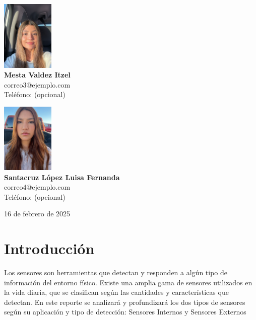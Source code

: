 \documentclass{article}
\begin{document}
\begin{titlepage}
\begin{center}
			\vspace{0.5cm}
			
			\begin{minipage}{0.45\textwidth}
				\begin{center}
					\includegraphics[width=2.5cm]{itzel.jpg} \\
					\textbf{Mesta Valdez Itzel} \\
					correo3@ejemplo.com \\
					Teléfono: (opcional)
				\end{center}
			\end{minipage}
			\hfill
			\begin{minipage}{0.45\textwidth}
				\begin{center}
					\includegraphics[width=2.5cm]{luisa.jpg} \\
					\textbf{Santacruz López Luisa Fernanda} \\
					correo4@ejemplo.com \\
					Teléfono: (opcional)
				\end{center}
			\end{minipage}
			
			\vfill
			16 de febrero de 2025
			
		\end{center}
		
	\end{titlepage}
	
	\tableofcontents
	\newpage
	
	\section{Introducción}
	Los sensores son herramientas que detectan y responden a algún tipo de información del entorno físico. Existe una amplia gama de sensores utilizados en la vida diaria, que se clasifican según las cantidades y características que detectan. En este reporte se analizará y profundizará los dos tipos de sensores según su aplicación y tipo de detección: Sensores Internos y Sensores Externos
	
\end{document}
